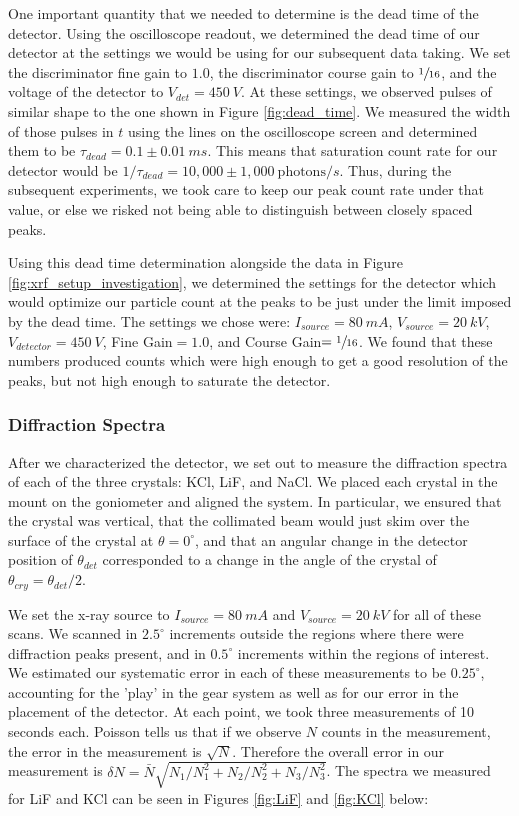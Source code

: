 \documentclass[%
 reprint,
 amsmath,amssymb,
 aps,
 pra,
]{revtex4-1}
\begin{document}
One important quantity that we needed to determine is the dead time of the detector. Using the oscilloscope readout, we determined the dead time of our detector at the settings we would be using for our subsequent data taking. We set the discriminator fine gain to $1.0$, the discriminator course gain to $\sfrac{1}{16}$, and the voltage of the detector to $V_{det} = 450~V$. At these settings, we observed pulses of similar shape to the one shown in Figure \ref{fig:dead_time}. We measured the width of those pulses in $t$ using the lines on the oscilloscope screen and determined them to be $\tau_{dead} = 0.1 \pm 0.01~ms$. This means that saturation count rate for our detector would be $1/\tau_{dead} = 10,000 \pm 1,000~\text{photons}/s$. Thus, during the subsequent experiments, we took care to keep our peak count rate under that value, or else we risked not being able to distinguish between closely spaced peaks.

Using this dead time determination alongside the data in Figure \ref{fig:xrf_setup_investigation}, we determined the settings for the detector which would optimize our particle count at the peaks to be just under the limit imposed by the dead time. The settings we chose were: $I_{source} = 80~mA$, $V_{source} = 20~kV$, $V_{detector} = 450~V$, Fine Gain$ = 1.0$, and Course Gain$ = \sfrac{1}{16}$. We found that these numbers produced counts which were high enough to get a good resolution of the peaks, but not high enough to saturate the detector.

\subsubsection{Diffraction Spectra}

After we characterized the detector, we set out to measure the diffraction spectra of each of the three crystals: KCl, LiF, and NaCl. We placed each crystal in the mount on the goniometer and aligned the system. In particular, we ensured that the crystal was vertical, that the collimated beam would just skim over the surface of the crystal at $\theta = 0^\circ$, and that an angular change in the detector position of $\theta_{det}$ corresponded to a change in the angle of the crystal of $\theta_{cry} = \theta_{det}/2$. 

We set the x-ray source to $I_{source} = 80~mA$ and $V_{source} = 20~kV$ for all of these scans. We scanned in $2.5^\circ$ increments outside the regions where there were diffraction peaks present, and in $0.5^\circ$ increments within the regions of interest. We estimated our systematic error in each of these measurements to be $0.25^\circ$, accounting for the 'play' in the gear system as well as for our error in the placement of the detector. At each point, we took three measurements of 10 seconds each. Poisson tells us that if we observe $N$ counts in the measurement, the error in the measurement is $\sqrt{N}$. Therefore the overall error in our measurement is $\delta N =\bar{N}\sqrt{N_1/N_1^2 + N_2/N_2^2 + N_3/N_3^2}$. The spectra we measured for LiF and KCl can be seen in Figures \ref{fig:LiF} and \ref{fig:KCl} below:
\end{document}
